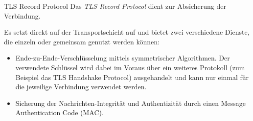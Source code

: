 \begin{defi}{TLS Record Protocol}
    Das \emph{TLS Record Protocol} dient zur Absicherung der Verbindung.

    Es setzt direkt auf der Transportschicht auf und bietet zwei verschiedene Dienste, die einzeln oder gemeinsam genutzt werden können:
    \begin{itemize}
        \item Ende-zu-Ende-Verschlüsselung mittels symmetrischer Algorithmen. Der verwendete Schlüssel wird dabei im Voraus über ein weiteres Protokoll (zum Beispiel das TLS Handshake Protocol) ausgehandelt und kann nur einmal für die jeweilige Verbindung verwendet werden.
        \item Sicherung der Nachrichten-Integrität und Authentizität durch einen Message Authentication Code (MAC).
    \end{itemize}
\end{defi}

